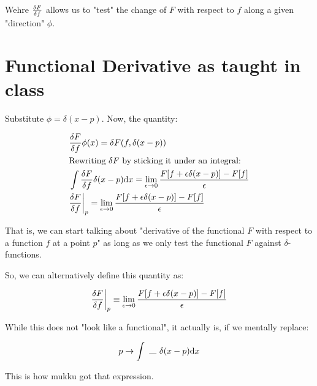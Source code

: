 Wehre $\fdv{F}{f}$ allows us to "test" the change of $F$ with respect to $f$
along a given "direction" $\phi$.

\section{Functional Derivative as taught in class}

Substitute $\phi = \delta (x - p)$. Now, the quantity:

\begin{align*}
    &\fdv{F}{f}(x) \phi(x) =
    \delta F (f, \delta (x - p))  \\
    &\text{Rewriting $\delta F$ by sticking it under an integral:} \\
    &\int \fdv{F}{f} (x) \delta (x - p) \dd x =  
    \lim_{\epsilon \to 0}
    \frac{F[f + \epsilon \delta (x - p)] - F[f]}{\epsilon}  \\
    & \fdv{F}{f}{\bigg \rvert_p} = 
    \lim_{\epsilon \to 0}
    \frac{F[f + \epsilon \delta (x - p)] - F[f]}{\epsilon}
\end{align*}

That is, we can start talking about "derivative of the functional $F$ with
respect to a function $f$ at a point $p$" as long as we only test the functional $F$ against
$\delta$-functions.

So, we can alternatively define this quantity as:

\begin{align*}
\fdv{F}{f}{\bigg \rvert_p} \equiv 
\lim_{\epsilon \to 0} \frac{F[f + \epsilon \delta (x - p)] - F[f]}{\epsilon}
\end{align*}

While this does not "look like a functional", it actually is, if we
mentally replace:

\begin{align*}
    p \to  \int ~\rule{0.3cm}{0.1mm}~\delta (x - p) \dd x
\end{align*}

This is how mukku got that expression.

